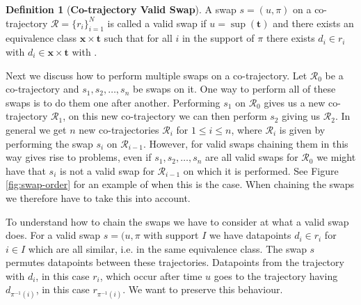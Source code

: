 \documentclass[12pt]{article}
\newcommand{\data}{d}
\newcommand{\traj}{r}
\newcommand{\cotraj}{\mathcal{R}}
\newcommand{\swap}{s}
\newcommand{\swaptime}{u}
\newcommand{\locint}{\mathbf{x}}
\newcommand{\timint}{\mathbf{t}}
\theoremstyle{definition}
\newtheorem{definition}{Definition}[section]
\begin{document}
\begin{definition}[\textbf{Co-trajectory Valid Swap}]
  A swap \(\swap = (\swaptime, \pi)\) on a co-trajectory
  \(\cotraj = \{\traj_{i}\}_{i = 1}^{N}\) is called a valid swap if
  \(\swaptime = \sup(\timint)\) and there exists an equivalence class
  \(\locint \times \timint\) such that for all \(i\) in the support of
  \(\pi\) there exists \(\data_{i} \in \traj_{i}\) with
  \(\data_{i} \in \locint \times \timint\) with .
\end{definition}

Next we discuss how to perform multiple swaps on a co-trajectory. Let
\(\cotraj_{0}\) be a co-trajectory and
\(\swap_{1}, \swap_{2}, \dots, \swap_{n}\) be swaps on it. One way to
perform all of these swaps is to do them one after another. Performing
\(\swap_{1}\) on \(\cotraj_{0}\) gives us a new co-trajectory
\(\cotraj_{1}\), on this new co-trajectory we can then perform
\(\swap_{2}\) giving us \(\cotraj_{2}\). In general we get \(n\) new
co-trajectories \(\cotraj_{i}\) for \(1 \leq i \leq n\), where
\(\cotraj_{i}\) is given by performing the swap \(\swap_{i}\) on
\(\cotraj_{i-1}\). However, for valid swaps chaining them in this way
gives rise to problems, even if
\(\swap_{1}, \swap_{2}, \dots, \swap_{n}\) are all valid swaps for
\(\cotraj_{0}\) we might have that \(s_{i}\) is not a valid swap for
\(\cotraj_{i - 1}\) on which it is performed. See Figure
\ref{fig:swap-order} for an example of when this is the case. When
chaining the swaps we therefore have to take this into account.

To understand how to chain the swaps we have to consider at what a
valid swap does. For a valid swap \(\swap = (\swaptime, \pi\) with
support \(I\) we have datapoints \(\data_{i} \in \traj_{i}\) for
\(i \in I\) which are all similar, i.e. in the same equivalence class.
The swap \(\swap\) permutes datapoints between these trajectories.
Datapoints from the trajectory with \(\data_{i}\), in this case
\(\traj_{i}\), which occur after time \(\swaptime\) goes to the
trajectory having \(\data_{\pi^{-1}(i)}\), in this case
\(\traj_{\pi^{-1}(i)}\). We want to preserve this behaviour.
\end{document}
